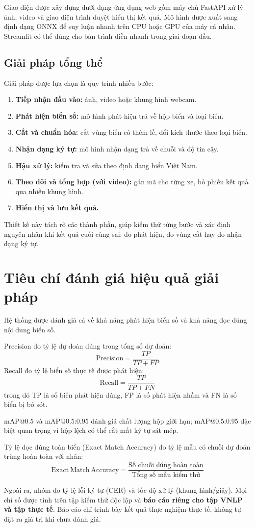 Giao diện được xây dựng dưới dạng ứng dụng web gồm máy chủ FastAPI xử lý ảnh, video và giao diện trình duyệt hiển thị kết quả. Mô hình được xuất sang định dạng ONNX để suy luận nhanh trên CPU hoặc GPU của máy cá nhân. Streamlit có thể dùng cho bản trình diễn nhanh trong giai đoạn đầu.

\subsection{Giải pháp tổng thể}

Giải pháp được lựa chọn là quy trình nhiều bước:

\begin{enumerate}
  \item \textbf{Tiếp nhận đầu vào:} ảnh, video hoặc khung hình webcam.
  \item \textbf{Phát hiện biển số:} mô hình phát hiện trả về hộp biển và loại biển.
  \item \textbf{Cắt và chuẩn hóa:} cắt vùng biển có thêm lề, đổi kích thước theo loại biển.
  \item \textbf{Nhận dạng ký tự:} mô hình nhận dạng trả về chuỗi và độ tin cậy.
  \item \textbf{Hậu xử lý:} kiểm tra và sửa theo định dạng biển Việt Nam.
  \item \textbf{Theo dõi và tổng hợp (với video):} gán mã cho từng xe, bỏ phiếu kết quả qua nhiều khung hình.
  \item \textbf{Hiển thị và lưu kết quả.}
\end{enumerate}

Thiết kế này tách rõ các thành phần, giúp kiểm thử từng bước và xác định nguyên nhân khi kết quả cuối cùng sai: do phát hiện, do vùng cắt hay do nhận dạng ký tự.

\section{Tiêu chí đánh giá hiệu quả giải pháp}

Hệ thống được đánh giá cả về khả năng phát hiện biển số và khả năng đọc đúng nội dung biển số.

Precision đo tỷ lệ dự đoán đúng trong tổng số dự đoán:
\[
  \mathrm{Precision} = \frac{TP}{TP + FP}
\]
Recall đo tỷ lệ biển số thực tế được phát hiện:
\[
  \mathrm{Recall} = \frac{TP}{TP + FN}
\]
trong đó TP là số biển phát hiện đúng, FP là số phát hiện nhầm và FN là số biển bị bỏ sót.

mAP@0.5 và mAP@0.5:0.95 đánh giá chất lượng hộp giới hạn; mAP@0.5:0.95 đặc biệt quan trọng vì hộp lệch có thể cắt mất ký tự sát mép.

Tỷ lệ đọc đúng toàn biển (Exact Match Accuracy) đo tỷ lệ mẫu có chuỗi dự đoán trùng hoàn toàn với nhãn:
\[
  \mathrm{Exact\ Match\ Accuracy} = \frac{\text{Số chuỗi đúng hoàn toàn}}{\text{Tổng số mẫu kiểm thử}}
\]

Ngoài ra, nhóm đo tỷ lệ lỗi ký tự (CER) và tốc độ xử lý (khung hình/giây). Mọi chỉ số được tính trên tập kiểm thử độc lập và \textbf{báo cáo riêng cho tập VNLP và tập thực tế}. Báo cáo chỉ trình bày kết quả thực nghiệm thực tế, không tự đặt ra giá trị khi chưa đánh giá.
